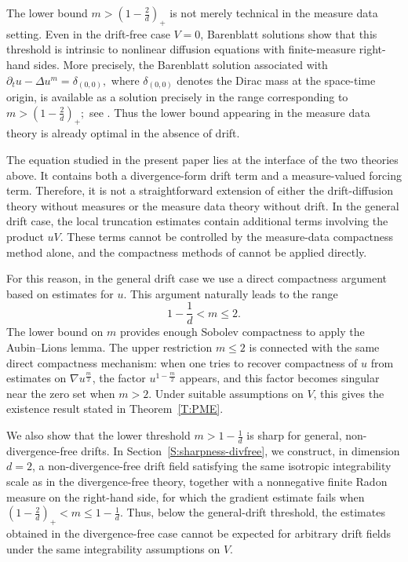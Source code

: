 \documentclass{amsart}
\numberwithin{equation}{section}
\begin{document}
The lower bound
\(
m>\left(1-\frac{2}{d}\right)_+
\)
is not merely technical in the measure data setting. Even in the drift-free case \(V=0\), Barenblatt solutions show that this threshold is intrinsic to nonlinear diffusion equations with finite-measure right-hand sides. More precisely, the Barenblatt solution associated with
\(
\partial_t u-\Delta u^m=\delta_{(0,0)},
\)
where \(\delta_{(0,0)}\) denotes the Dirac mass at the space-time origin, is available as a solution precisely in the range corresponding
to
\(
m>\left(1-\frac{2}{d}\right)_+;
\)
see \cite{BDG13,BDG15}. Thus the lower bound appearing in the measure data theory is already optimal in the absence of drift.






The equation studied in the present paper lies at the interface of the two theories above. It contains both a divergence-form drift term and a measure-valued forcing term. Therefore, it is not a straightforward extension of either the drift-diffusion theory without measures or the measure data theory without drift. In the general drift case, the local truncation estimates contain additional terms involving the product \(uV\). These terms cannot be controlled by the measure-data compactness method alone, and the compactness methods of \cite{BDG13,BDG15} cannot be applied directly.






For this reason, in the general drift case we use a direct compactness argument based on estimates for \(u\). This argument naturally leads to the range
\[
1-\frac{1}{d}<m\le2.
\]
The lower bound on \(m\) provides enough Sobolev compactness to apply the Aubin--Lions lemma. The upper restriction \(m\le2\) is connected with the same direct compactness mechanism: when one tries to recover compactness of \(u\) from estimates on \(\nabla u^{\frac{m}{2}}\), the factor
\(
u^{1-\frac{m}{2}}
\)
appears, and this factor becomes singular near the zero set when \(m>2\). Under suitable assumptions on \(V\), this gives the existence result stated in Theorem~\ref{T:PME}.




We also show that the lower threshold
\(
m>1-\frac{1}{d}
\)
is sharp for general, non-divergence-free drifts. In
Section~\ref{S:sharpness-divfree}, we construct, in dimension \(d=2\), a
non-divergence-free drift field satisfying the same isotropic integrability
scale as in the divergence-free theory, together with a nonnegative finite
Radon measure on the right-hand side, for which the gradient estimate fails
when
\(
\left(1-\frac{2}{d}\right)_+<m\le 1-\frac{1}{d}.
\)
Thus, below the general-drift threshold, the estimates obtained in the
divergence-free case cannot be expected for arbitrary drift fields under the
same integrability assumptions on \(V\).
\end{document}

